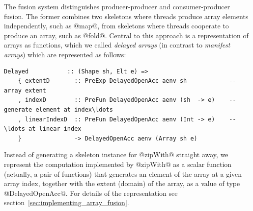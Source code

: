 The fusion system distinguishes producer-producer and consumer-producer fusion.
The former combines two skeletons where threads produce array elements
independently, such as @map@, from skeletons where threads cooperate to produce
an array, such as @fold@. Central to this approach is a representation of arrays
as functions, which we called \emph{delayed arrays} (in
contrast to \emph{manifest arrays}) which are represented
as follows:
%
\begin{lstlisting}[style=haskell]
  Delayed           :: (Shape sh, Elt e) =>
    { extentD       :: PreExp DelayedOpenAcc aenv sh            -- array extent
    , indexD        :: PreFun DelayedOpenAcc aenv (sh  -> e)    -- generate element at index\ldots
    , linearIndexD  :: PreFun DelayedOpenAcc aenv (Int -> e)    -- \ldots at linear index
    }               -> DelayedOpenAcc aenv (Array sh e)
\end{lstlisting}
%
Instead of generating a skeleton instance for @zipWith@ straight away, we
represent the computation implemented by @zipWith@ as a scalar function
(actually, a pair of functions) that generates an element of the array at a
given array index, together with the extent (domain) of the array, as a value of
type @DelayedOpenAcc@. For details of the representation see
section~\ref{sec:implementing_array_fusion}.

